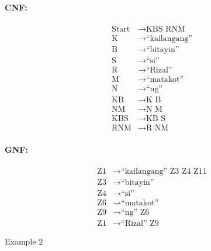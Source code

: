 \paragraph{CNF:}
\begin{equation*}
    \begin{aligned}
        \text{Start}   & \rightarrow \text{KBS RNM}   \\
        \text{K} & \rightarrow \text{“kailangang”} \\
        \text{B} & \rightarrow \text{“bitayin”} \\
        \text{S} & \rightarrow \text{“si”} \\
        \text{R} & \rightarrow \text{“Rizal”} \\
        \text{M} & \rightarrow \text{“matakot”} \\
        \text{N} & \rightarrow \text{“ng”} \\
        \text{KB} & \rightarrow \text{K B} \\
        \text{NM} & \rightarrow \text{N M} \\
        \text{KBS} & \rightarrow \text{KB S} \\
        \text{RNM} & \rightarrow \text{R NM}
    \end{aligned}
\end{equation*}

\paragraph{GNF:}
\begin{equation*}
    \begin{aligned}
        \text{Z1}   & \rightarrow \text{“kailangang” Z3 Z4 Z11}   \\
        \text{Z3} & \rightarrow \text{“bitayin”} \\
        \text{Z4} & \rightarrow \text{“si”} \\
        \text{Z6} & \rightarrow \text{“matakot”} \\
        \text{Z9} & \rightarrow \text{“ng” Z6} \\
        \text{Z1} & \rightarrow \text{“Rizal” Z9}
    \end{aligned}
\end{equation*}

Example 2
